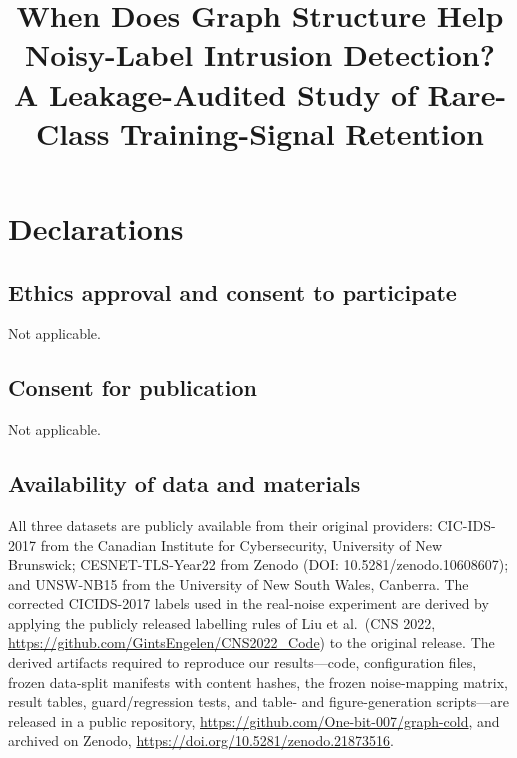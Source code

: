 \documentclass[pdflatex,sn-basic,Numbered]{sn-jnl}
\begin{document}
\title[When Does Graph Structure Help Noisy-Label IDS?]{When Does Graph Structure Help Noisy-Label Intrusion Detection?
A Leakage-Audited Study of Rare-Class Training-Signal Retention}

\author*[1]{ }
\author[2]{ }
\author[2]{ }
\author[2]{ }


\maketitle

\section*{Declarations}

\subsection*{Ethics approval and consent to participate}
Not applicable.

\subsection*{Consent for publication}
Not applicable.

\subsection*{Availability of data and materials}
All three datasets are publicly available from their original providers:
CIC-IDS-2017 from the Canadian Institute for Cybersecurity, University of New
Brunswick; CESNET-TLS-Year22 from Zenodo (DOI: 10.5281/zenodo.10608607); and
UNSW-NB15 from the University of New South Wales, Canberra. The corrected
CICIDS-2017 labels used in the real-noise experiment are derived by applying
the publicly released labelling rules of Liu et al.\ (CNS 2022,
\url{https://github.com/GintsEngelen/CNS2022_Code}) to the original release.
The derived
artifacts required to reproduce our results---code, configuration files, frozen
data-split manifests with content hashes, the frozen noise-mapping matrix,
result tables, guard/regression tests, and table- and figure-generation
scripts---are released in a public repository,
\url{https://github.com/One-bit-007/graph-cold}, and archived on Zenodo,
\url{https://doi.org/10.5281/zenodo.21873516}.
\end{document}
